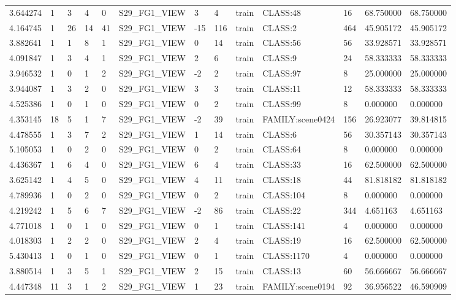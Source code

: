 \begin{tabular}{lllllllllllll}
3.644274 & 1 & 3 & 4 & 0 & S29\_FG1\_VIEW & 3 & 4 & train & CLASS:48 & 16 & 68.750000 & 68.750000 \\
4.164745 & 1 & 26 & 14 & 41 & S29\_FG1\_VIEW & -15 & 116 & train & CLASS:2 & 464 & 45.905172 & 45.905172 \\
3.882641 & 1 & 1 & 8 & 1 & S29\_FG1\_VIEW & 0 & 14 & train & CLASS:56 & 56 & 33.928571 & 33.928571 \\
4.091847 & 1 & 3 & 4 & 1 & S29\_FG1\_VIEW & 2 & 6 & train & CLASS:9 & 24 & 58.333333 & 58.333333 \\
3.946532 & 1 & 0 & 1 & 2 & S29\_FG1\_VIEW & -2 & 2 & train & CLASS:97 & 8 & 25.000000 & 25.000000 \\
3.944087 & 1 & 3 & 2 & 0 & S29\_FG1\_VIEW & 3 & 3 & train & CLASS:11 & 12 & 58.333333 & 58.333333 \\
4.525386 & 1 & 0 & 1 & 0 & S29\_FG1\_VIEW & 0 & 2 & train & CLASS:99 & 8 & 0.000000 & 0.000000 \\
4.353145 & 18 & 5 & 1 & 7 & S29\_FG1\_VIEW & -2 & 39 & train & FAMILY:scene0424 & 156 & 26.923077 & 39.814815 \\
4.478555 & 1 & 3 & 7 & 2 & S29\_FG1\_VIEW & 1 & 14 & train & CLASS:6 & 56 & 30.357143 & 30.357143 \\
5.105053 & 1 & 0 & 2 & 0 & S29\_FG1\_VIEW & 0 & 2 & train & CLASS:64 & 8 & 0.000000 & 0.000000 \\
4.436367 & 1 & 6 & 4 & 0 & S29\_FG1\_VIEW & 6 & 4 & train & CLASS:33 & 16 & 62.500000 & 62.500000 \\
3.625142 & 1 & 4 & 5 & 0 & S29\_FG1\_VIEW & 4 & 11 & train & CLASS:18 & 44 & 81.818182 & 81.818182 \\
4.789936 & 1 & 0 & 2 & 0 & S29\_FG1\_VIEW & 0 & 2 & train & CLASS:104 & 8 & 0.000000 & 0.000000 \\
4.219242 & 1 & 5 & 6 & 7 & S29\_FG1\_VIEW & -2 & 86 & train & CLASS:22 & 344 & 4.651163 & 4.651163 \\
4.771018 & 1 & 0 & 1 & 0 & S29\_FG1\_VIEW & 0 & 1 & train & CLASS:141 & 4 & 0.000000 & 0.000000 \\
4.018303 & 1 & 2 & 2 & 0 & S29\_FG1\_VIEW & 2 & 4 & train & CLASS:19 & 16 & 62.500000 & 62.500000 \\
5.430413 & 1 & 0 & 1 & 0 & S29\_FG1\_VIEW & 0 & 1 & train & CLASS:1170 & 4 & 0.000000 & 0.000000 \\
3.880514 & 1 & 3 & 5 & 1 & S29\_FG1\_VIEW & 2 & 15 & train & CLASS:13 & 60 & 56.666667 & 56.666667 \\
4.447348 & 11 & 3 & 1 & 2 & S29\_FG1\_VIEW & 1 & 23 & train & FAMILY:scene0194 & 92 & 36.956522 & 46.590909 \\

\end{tabular}
